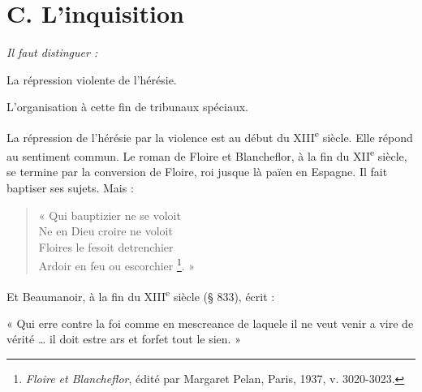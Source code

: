 \documentclass[french,twoside]{book} %
\newlength{\listmod}
\newcommand{\listhead}[1]{\hspace{-1\listmod}\emph{#1}}
\newcommand{\labelchar}[1]{{\color{rubric}\bf #1}}
\newenvironment{quoteblock}%
  {\begin{quoting}}
  {\end{quoting}}
\newenvironment{quotebar}{%
    \def\FrameCommand{{\color{rubric!10!}\vrule width 0.5em} \hspace{0.9em}}%
    \def\OuterFrameSep{\itemsep} %
    \MakeFramed {\advance\hsize-\width \FrameRestore}
  }%
  {%
    \endMakeFramed
  }
\renewenvironment{quoteblock}%
  {%
    \small
    \savenotes
    \begin{quotebar}
  }
  {%
    \end{quotebar}
    \spewnotes
  }
\begin{document}
\section[C. L’inquisition]{C. L’inquisition}
\label{c10c}

\begin{listalpha}[itemsep=0pt,]
\item[]\listhead{Il faut distinguer :}
\item La répression violente de l’hérésie.
\item L’organisation à cette fin de tribunaux spéciaux.

\end{listalpha}\noindent \labelchar{a)} La répression de l’hérésie par la violence est au début du XIII\textsuperscript{e} siècle. Elle répond au sentiment commun. Le roman de Floire et Blancheflor, à la fin du XII\textsuperscript{e} siècle, se termine par la conversion de Floire, roi jusque là païen en Espagne. Il fait baptiser ses sujets. Mais :\par


\begin{verse}
« Qui bauptizier ne se voloit\\
Ne en Dieu croire ne voloit\\
Floires le fesoit detrenchier\\
Ardoir en feu ou escorchier \footnote{{\itshape Floire et Blancheflor}, édité par Margaret Pelan, Paris, 1937, v. 3020-3023.}. »\\
\end{verse}

\noindent Et Beaumanoir, à la fin du XIII\textsuperscript{e} siècle (§ 833), écrit :\par

\begin{quoteblock}
\noindent « Qui erre contre la foi comme en mescreance de laquele il ne veut venir a vire de vérité … il doit estre ars et forfet tout le sien. »\end{quoteblock}
\end{document}
